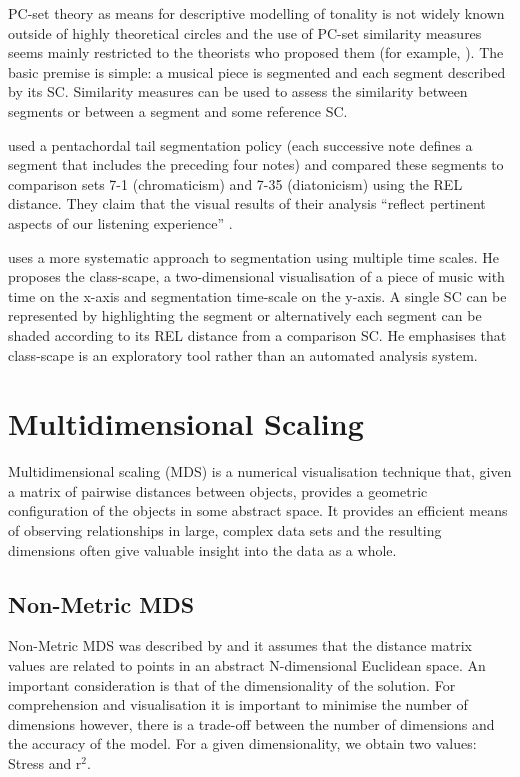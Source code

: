 \documentclass{article}
\begin{document}
PC-set theory as means for descriptive modelling of tonality is not
widely known outside of highly theoretical circles and the use of
PC-set similarity measures seems mainly restricted to the theorists
who proposed them (for example, \citealt{Isaacson1996}). The basic
premise is simple: a musical piece is segmented and each segment
described by its SC. Similarity measures can be used to assess the
similarity between segments or between a segment and some reference
SC.

\citet{Huovinen2007} used a pentachordal tail segmentation policy
(each successive note defines a segment that includes the preceding
four notes) and compared these segments to comparison sets 7-1
(chromaticism) and 7-35 (diatonicism) using the REL distance. They
claim that the visual results of their analysis ``reflect pertinent
aspects of our listening experience'' \citep[pp. 204]{Huovinen}.

\citet[chap. 5.3]{Martorell2013} uses a more systematic approach to
segmentation using multiple time scales. He proposes the class-scape,
a two-dimensional visualisation of a piece of music with time on the
x-axis and segmentation time-scale on the y-axis. A single SC can be
represented by highlighting the segment or alternatively each segment
can be shaded according to its REL distance from a comparison SC. He
emphasises that class-scape is an exploratory tool rather than an
automated analysis system.
\section{Multidimensional Scaling}
\label{sec-4}

Multidimensional scaling (MDS) is a numerical visualisation technique
that, given a matrix of pairwise distances between objects, provides a
geometric configuration of the objects in some abstract space. It
provides an efficient means of observing relationships in large,
complex data sets and the resulting dimensions often give valuable
insight into the data as a whole.
\subsection{Non-Metric MDS}
\label{sec-4-1}

Non-Metric MDS was described by \citet{Shepard1962} and it assumes
that the distance matrix values are related to points in an abstract
N-dimensional Euclidean space. An important consideration is that of
the dimensionality of the solution. For comprehension and
visualisation it is important to minimise the number of dimensions
however, there is a trade-off between the number of dimensions and the
accuracy of the model. For a given dimensionality, we obtain two
values: Stress and r$^2$.
\end{document}
